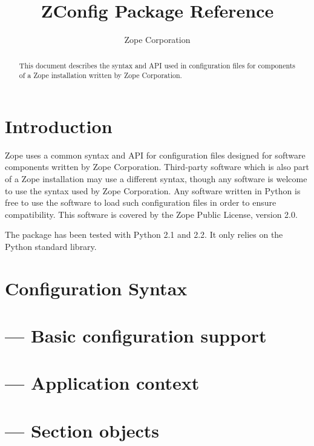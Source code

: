 \documentclass{howto}
\title{ZConfig Package Reference}
\author{Zope Corporation}
\begin{document}
\maketitle

\begin{abstract}
\noindent
This document describes the syntax and API used in configuration files
for components of a Zope installation written by Zope Corporation.
\end{abstract}

\tableofcontents


\section{Introduction \label{intro}}

Zope uses a common syntax and API for configuration files designed for
software components written by Zope Corporation.  Third-party software
which is also part of a Zope installation may use a different syntax,
though any software is welcome to use the syntax used by Zope
Corporation.  Any software written in Python is free to use the
 software to load such configuration files in order to
ensure compatibility.  This software is covered by the Zope Public
License, version 2.0.

The  package has been tested with Python 2.1 and 2.2.
It only relies on the Python standard library.


\section{Configuration Syntax \label{syntax}}


\section{ --- Basic configuration support}



\section{ --- Application context}



\section{ --- Section objects}
\end{document}
